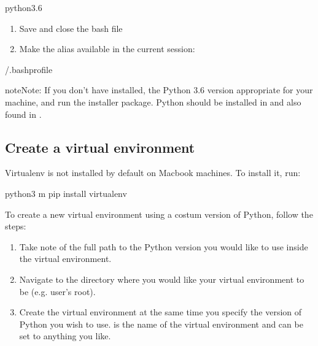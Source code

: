 \documentclass[letterpaper,10pt,english]{sphinxmanual}
\begin{document}
\begin{sphinxVerbatim}[commandchars=\\\{\}]
 python3.6
\end{sphinxVerbatim}
\begin{enumerate}
%
\item {} 
Save and close the bash file

\item {} 
Make the alias available in the current session:

\end{enumerate}

\begin{sphinxVerbatim}[commandchars=\\\{\}]
\PYGZdl{}  \PYGZti{}/.bash\PYGZus{}profile
\end{sphinxVerbatim}

\begin{sphinxadmonition}{note}{Note:}
If you don’t have  installed,  the Python 3.6 version appropriate for your machine, and run the installer package. Python should be installed in  and also found in .
\end{sphinxadmonition}


\subsection{Create a virtual environment}
\label{\detokenize{intro/getting-started-with-build:create-a-virtual-environment}}
Virtualenv is not installed by default on Macbook machines. To install it, run:

\begin{sphinxVerbatim}[commandchars=\\\{\}]
\PYGZdl{} python3 \PYGZhy{}m pip install virtualenv
\end{sphinxVerbatim}

To create a new virtual environment using a costum version of Python, follow the steps:
\begin{enumerate}
%
\item {} 
Take note of the full path to the Python version you would like to use inside the virtual environment.

\item {} 
Navigate to the directory where you would like your virtual environment to be (e.g. user’s root).

\item {} 
Create the virtual environment at the same time you specify the version of Python you wish to use.  is the name of the virtual environment and can be set to anything you like.

\end{enumerate}
\end{document}
